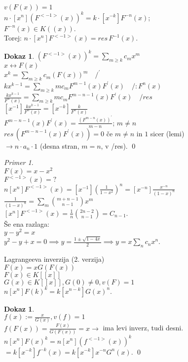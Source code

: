 \documentclass[a4paper, 12pt]{book}
\theoremstyle{definition}
\newtheorem{pro}[counter]{Dokaz}
\theoremstyle{remark}
\newtheorem*{ex}{Primer}
\begin{document}
$v(F(x)) = 1$ \\
$n \cdot [x^n] \left(F^{<-1>}(x)\right)^k = k \cdot [x^{-k}] F^{-n}(x)$; \\
$F^{-n}(x) \in K((x))$. \\
Torej: $n \cdot [x^n] F^{<-1>}(x) = res \, F^{-1}(x)$.
\begin{pro}
  $\left(F^{<-1>}(x)\right)^k = \sum_{m \geq k} c_m x^m$ \\
  $x \leftrightarrow F(x)$ \\
  $x^k = \sum_{m \geq k} c_m (F(x))^m \quad /^{'}$ \\
  $k x^{k-1} = \sum_{m \geq k} m c_m F^{m-1}(x) F^{'}(x) \quad /: F^n(x)$ \\
  $\frac{k x^{k-1}}{F^n(x)} = \sum_{m \geq k} m c_m F^{m-n-1}(x) F^{'}(x) \quad / res$ \\
  $[x^{-1}] \frac{k x^{k-1}}{F^n(x)} = [x^{-k}] \frac{k}{F^n(x)}$ \\
  $F^{m-n-1}(x) F^{'}(x) = \frac{\left(F^{m-n}(x)\right)^{'}}{m-n}$; $m \neq n$ \\
  $res \, \left(F^{m-n-1}(x) F^{'}(x)\right) = 0$ če $m \neq n$ in $1$ sicer (lemi) \\
  $\to n \cdot a_n \cdot 1$ (desna stran, $m=n$, v /res).
  \qed
\end{pro}
\begin{ex} \text{} \\
  $F(x) = x - x^2$ \\
  $F^{<-1>}(x) = ?$ \\
  $n [x^n] F^{<-1>}(x) = [x^{-1}] \left(\frac{1}{1-x^2}\right)^n = [x^{-n}] \frac{x^{-n}}{(1-x)^n}$ \\
  $\frac{1}{(1-x)^n} = \sum_m \binom{m+n-1}{n-1} x^m$ \\
  $[x^n] F^{<-1>}(x) = \frac{1}{n} \binom{2n-2}{n-1} = C_{n-1}$. \\
  Še ena razlaga: \\
  $y - y^2 = x$ \\
  $y^2 - y + x = 0 \implies y = \frac{1 \pm \sqrt{1-4x}}{2} \implies y = x \sum_n c_n x^n$.
\end{ex}
Lagrangeeva inverzija (2. verzija) \\
$F(x) = x G(F(x))$ \\
$F(x) \in K[[x]]$ \\
$G(x) \in K[[x]], G(0) \neq 0, v(F) = 1$ \\
$n[x^n] F(k)^k = k [x^{n-k}] G(x)^n$.
\begin{pro} \text{} \\
  $f(x) := \frac{x}{G(x)}, v(f) = 1$ \\
  $f(F(x)) = \frac{F(x)}{G(F(x))} = x \to$ ima levi inverz, tudi desni. \\
  $n [x^n] F(x)^k = n [x^n] \left(f^{<-1>}(x)\right)^k$ \\
  $= k [x^{-k}] f^{-k}(x) = k [x^{-k}] x^{-n} G^n(x)$.
  \qed
\end{pro}
\end{document}
